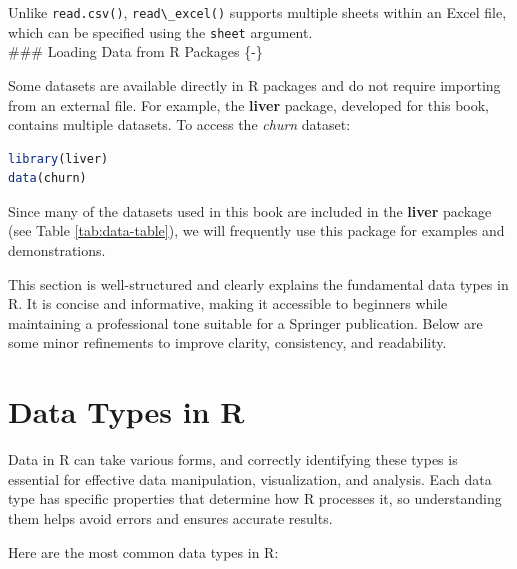 \documentclass[
]{book}
\newcommand{\passthrough}[1]{#1}
\theoremstyle{definition}
\theoremstyle{definition}
\theoremstyle{definition}
\theoremstyle{definition}
\theoremstyle{remark}
\begin{document}
Unlike \passthrough{\lstinline!read.csv()!}, \passthrough{\lstinline!read\_excel()!} supports multiple sheets within an Excel file, which can be specified using the \passthrough{\lstinline!sheet!} argument.\\
\#\#\# Loading Data from R Packages \{-\}

Some datasets are available directly in R packages and do not require importing from an external file. For example, the \textbf{liver} package, developed for this book, contains multiple datasets. To access the \emph{churn} dataset:

\begin{lstlisting}[language=R]
library(liver)
data(churn)
\end{lstlisting}

Since many of the datasets used in this book are included in the \textbf{liver} package (see Table \ref{tab:data-table}), we will frequently use this package for examples and demonstrations.

This section is well-structured and clearly explains the fundamental data types in R. It is concise and informative, making it accessible to beginners while maintaining a professional tone suitable for a Springer publication. Below are some minor refinements to improve clarity, consistency, and readability.

\section{Data Types in R}\label{data-types-in-r}

Data in R can take various forms, and correctly identifying these types is essential for effective data manipulation, visualization, and analysis. Each data type has specific properties that determine how R processes it, so understanding them helps avoid errors and ensures accurate results.

Here are the most common data types in R:
\end{document}
